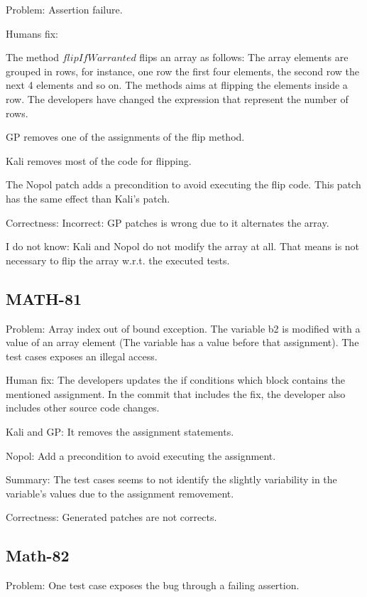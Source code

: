 \documentclass{article}
\begin{document}
Problem:
Assertion failure.

Humans fix:

The method $flipIfWarranted$ flips an array as follows:
The array elements are grouped in rows, for instance, one row the first four elements, the second row the next 4 elements and so on.
The methods aims at flipping the elements inside a row.
The developers have changed the expression that represent the number of rows.

GP removes one of the assignments of the flip method.

Kali removes most of the code for flipping.

The Nopol patch adds a precondition to avoid executing the flip code. This patch has the same effect than Kali's patch.  


Correctness:
Incorrect: GP patches is wrong due to it alternates the array.

I do not know: Kali and Nopol do not modify the array at all. That means is not necessary to flip the array w.r.t. the executed tests.

\subsection{MATH-81}

Problem:
Array index out of bound exception.
The variable b2 is modified with a value of an array element (The variable has a value before that assignment). The test cases exposes an illegal access.

Human fix:
The developers updates the if conditions which block contains the mentioned assignment.
In the commit that includes the fix, the developer also includes other source code changes.


Kali and GP: It removes the assignment statements.

Nopol: Add a precondition to avoid executing the assignment.

Summary:
The test cases seems to not identify the slightly variability in the variable's values due to the assignment removement.

Correctness:
Generated patches are  not corrects. 

\subsection{Math-82}

Problem: 
One test case exposes the bug through a failing assertion.
\end{document}
